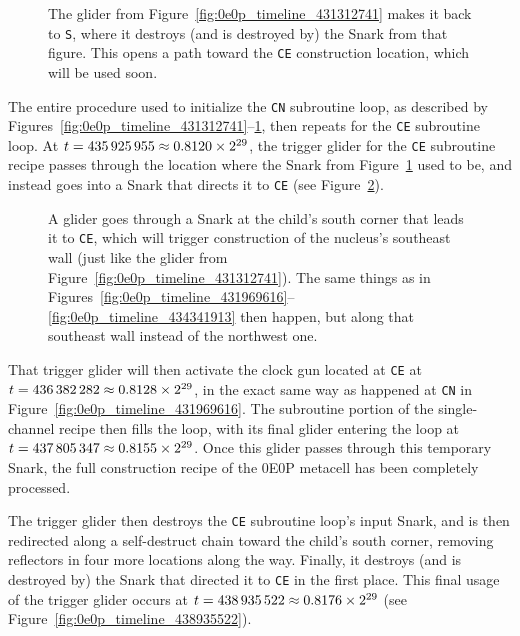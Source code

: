 \begin{figure}[!htb]
	\centering
	\caption{The glider from Figure~\ref{fig:0e0p_timeline_431312741} makes it back to \texttt{S}, where it destroys (and is destroyed by) the Snark from that figure. This opens a path toward the \texttt{CE} construction location, which will be used soon.}
	\label{fig:0e0p_timeline_434724270}
\end{figure}

The entire procedure used to initialize the \texttt{CN} subroutine loop, as described by Figures~\ref{fig:0e0p_timeline_431312741}--\ref{fig:0e0p_timeline_434724270}, then repeats for the \texttt{CE} subroutine loop. At $t = 435{\,}925{\,}955 \approx 0.8120 \times 2^{29}$, the trigger glider for the \texttt{CE} subroutine recipe passes through the location where the Snark from Figure~\ref{fig:0e0p_timeline_434724270} used to be, and instead goes into a Snark that directs it to \texttt{CE} (see Figure~\ref{fig:0e0p_timeline_435925955}).

\begin{figure}[!htb]
	\centering
	\caption{A glider goes through a Snark at the child's south corner that leads it to \texttt{CE}, which will trigger construction of the nucleus's southeast wall (just like the glider from Figure~\ref{fig:0e0p_timeline_431312741}). The same things as in Figures~\ref{fig:0e0p_timeline_431969616}--\ref{fig:0e0p_timeline_434341913} then happen, but along that southeast wall instead of the northwest one.}
	\label{fig:0e0p_timeline_435925955}
\end{figure}

That trigger glider will then activate the clock gun located at \texttt{CE} at $t = 436{\,}382{\,}282 \approx 0.8128 \times 2^{29}$, in the exact same way as happened at \texttt{CN} in Figure~\ref{fig:0e0p_timeline_431969616}. The subroutine portion of the single-channel recipe then fills the loop, with its final glider entering the loop at $t = 437{\,}805{\,}347 \approx 0.8155 \times 2^{29}$. Once this glider passes through this temporary Snark, the full construction recipe of the 0E0P metacell has been completely processed.

The trigger glider then destroys the \texttt{CE} subroutine loop's input Snark, and is then redirected along a self-destruct chain toward the child's south corner, removing reflectors in four more locations along the way. Finally, it destroys (and is destroyed by) the Snark that directed it to \texttt{CE} in the first place. This final usage of the trigger glider occurs at $t = 438{\,}935{\,}522 \approx 0.8176 \times 2^{29}$ (see Figure~\ref{fig:0e0p_timeline_438935522}).

